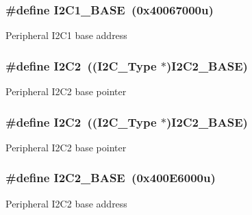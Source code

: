 \subsubsection[{\texorpdfstring{I2\+C1\+\_\+\+B\+A\+SE}{I2C1_BASE}}]{\setlength{\rightskip}{0pt plus 5cm}\#define I2\+C1\+\_\+\+B\+A\+SE~(0x40067000u)}\hypertarget{group__I2C__Peripheral__Access__Layer_gacd72dbffb1738ca87c838545c4eb85a3}{}\label{group__I2C__Peripheral__Access__Layer_gacd72dbffb1738ca87c838545c4eb85a3}
Peripheral I2\+C1 base address 
\subsubsection[{\texorpdfstring{I2\+C2}{I2C2}}]{\setlength{\rightskip}{0pt plus 5cm}\#define I2\+C2~(({\bf I2\+C\+\_\+\+Type} $\ast$){\bf I2\+C2\+\_\+\+B\+A\+SE})}\hypertarget{group__I2C__Peripheral__Access__Layer_gafa60ac20c1921ef1002083bb3e1f5d16}{}\label{group__I2C__Peripheral__Access__Layer_gafa60ac20c1921ef1002083bb3e1f5d16}
Peripheral I2\+C2 base pointer 
\subsubsection[{\texorpdfstring{I2\+C2}{I2C2}}]{\setlength{\rightskip}{0pt plus 5cm}\#define I2\+C2~(({\bf I2\+C\+\_\+\+Type} $\ast$){\bf I2\+C2\+\_\+\+B\+A\+SE})}\hypertarget{group__I2C__Peripheral__Access__Layer_gafa60ac20c1921ef1002083bb3e1f5d16}{}\label{group__I2C__Peripheral__Access__Layer_gafa60ac20c1921ef1002083bb3e1f5d16}
Peripheral I2\+C2 base pointer 
\subsubsection[{\texorpdfstring{I2\+C2\+\_\+\+B\+A\+SE}{I2C2_BASE}}]{\setlength{\rightskip}{0pt plus 5cm}\#define I2\+C2\+\_\+\+B\+A\+SE~(0x400\+E6000u)}\hypertarget{group__I2C__Peripheral__Access__Layer_ga04bda70f25c795fb79f163b633ad4a5d}{}\label{group__I2C__Peripheral__Access__Layer_ga04bda70f25c795fb79f163b633ad4a5d}
Peripheral I2\+C2 base address 
